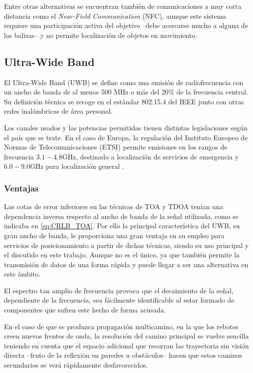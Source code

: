 Entre otras alternativas se encuentran también de comunicaciones a muy corta distancia como el \textit{Near-Field Communication} (NFC), aunque este sistema requiere una participación activa del objetivo --debe acercarse mucho a alguna de las balizas-- y no permite localización de objetos en movimiento.

\subsection{Ultra-Wide Band}

El Ultra-Wide Band (UWB) se define como una emisión de radiofrecuencia con un ancho de banda de al menos 500 MHz o más del 20\% de la frecuencia central.
Su definición técnica se recoge en el estándar 802.15.4 del IEEE junto con otras redes inalámbricas de área personal.

Los canales usados y las potencias permitidas tienen distintas legislaciones según el país que se trate.
En el caso de Europa, la regulación del Instituto Europeo de Normas de Telecomunicaciones (ETSI) permite emisiones en los rangos de frecuencia $3.1 - 4.8\si{\giga\hertz}$, destinado a localización de servicios de emergencia y  $6.0 - 9.0\si{\giga\hertz}$ para localización general \cite{UWB_regs}.

\subsubsection{Ventajas}

Las cotas de error inferiores en las técnicas de TOA y TDOA tenían una dependencia inversa respecto al ancho de banda de la señal utilizada, como se indicaba en \eqref{eq:CRLB_TOA}.
Por ello la principal característica del UWB, su gran ancho de banda, le proporciona una gran ventaja en su empleo para servicios de posicionamiento a partir de dichas técnicas, siendo su uso principal y el discutido en este trabajo.
Aunque no es el único, ya que también permite la transmisión de datos de una forma rápida y puede llegar a ser una alternativa en este ámbito.

El espectro tan amplio de frecuencia provoca que el decaimiento de la señal, dependiente de la frecuencia, sea fácilmente identificable al estar formado de componentes que sufren este hecho de forma acusada.

En el caso de que se produzca propagación multicamino, en la que los rebotes creen nuevos frentes de onda, la resolución del camino principal se vuelve sencilla teniendo en cuenta que el espacio adicional que recorran las trayectoria sin visión directa --fruto de la reflexión en paredes u obstáculos-- hacen que estos caminos secundarios se verá rápidamente desfavorecidos.

